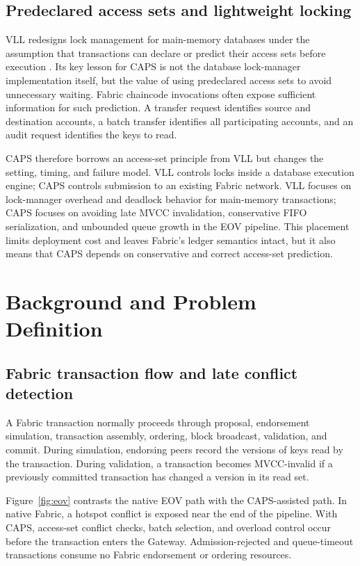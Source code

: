 \documentclass[fleqn,10pt,lineno]{wlpeerj}
\begin{document}
\subsection*{Predeclared access sets and lightweight locking}

VLL redesigns lock management for main-memory databases under the assumption that transactions can declare or predict their access sets before execution \citep{ren2015vll}. Its key lesson for CAPS is not the database lock-manager implementation itself, but the value of using predeclared access sets to avoid unnecessary waiting. Fabric chaincode invocations often expose sufficient information for such prediction. A transfer request identifies source and destination accounts, a batch transfer identifies all participating accounts, and an audit request identifies the keys to read.

CAPS therefore borrows an access-set principle from VLL but changes the setting, timing, and failure model. VLL controls locks inside a database execution engine; CAPS controls submission to an existing Fabric network. VLL focuses on lock-manager overhead and deadlock behavior for main-memory transactions; CAPS focuses on avoiding late MVCC invalidation, conservative FIFO serialization, and unbounded queue growth in the EOV pipeline. This placement limits deployment cost and leaves Fabric's ledger semantics intact, but it also means that CAPS depends on conservative and correct access-set prediction.

\section*{Background and Problem Definition}

\subsection*{Fabric transaction flow and late conflict detection}

A Fabric transaction normally proceeds through proposal, endorsement simulation, transaction assembly, ordering, block broadcast, validation, and commit. During simulation, endorsing peers record the versions of keys read by the transaction. During validation, a transaction becomes MVCC-invalid if a previously committed transaction has changed a version in its read set.

Figure~\ref{fig:eov} contrasts the native EOV path with the CAPS-assisted path. In native Fabric, a hotspot conflict is exposed near the end of the pipeline. With CAPS, access-set conflict checks, batch selection, and overload control occur before the transaction enters the Gateway. Admission-rejected and queue-timeout transactions consume no Fabric endorsement or ordering resources.
\end{document}
